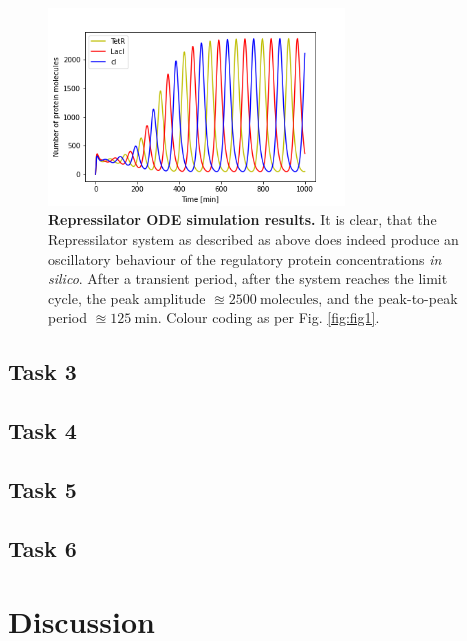 \documentclass[runningheads,a4paper]{llncs}
\begin{document}
\begin{figure}
    \singlespacing
    \centering
    \includegraphics[width=0.70\textwidth]{suplementary_information_and_code/Task2_figure1.png}
    \caption{\textbf{Repressilator ODE simulation results.} It is clear, that the Repressilator system as described as above does indeed produce an oscillatory behaviour of the regulatory protein concentrations \textit{in silico}. After a transient period, after the system reaches the limit cycle, the peak amplitude $\approxeq 2500\ \textrm{molecules}$, and the peak-to-peak period $\approxeq 125\ \textrm{min}$. Colour coding as per Fig. \ref{fig:fig1}.}  
    \label{fig:fig4}
\end{figure}

\subsection*{Task 3}
\subsection*{Task 4}
\subsection*{Task 5}
\subsection*{Task 6}

\section*{Discussion}


%
\clearpage

\singlespacing
\twocolumn
\raggedright
\raggedbottom
{}
%
\small{}

%
\end{document}
